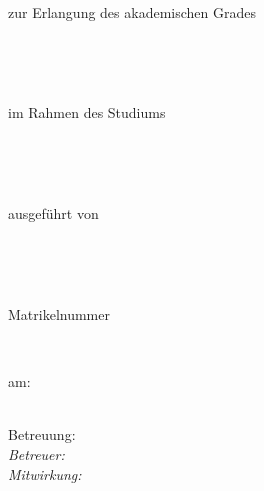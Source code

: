 \begin{titlepage}
\begin{center}
\begin{Large}\thesistype \end{Large} \bigskip \\
\begin{normalsize}zur Erlangung des akademischen Grades \end{normalsize} \bigskip \\
\begin{Large}\dmseries\zuerlangendertitel\end{Large} \bigskip \\
\begin{normalsize}im Rahmen des Studiums\end{normalsize} \bigskip \\
\begin{large}\dmseries\studium\end{large} \bigskip \\
\begin{normalsize}ausgef\"{u}hrt von \end{normalsize} \bigskip \\
\begin{large}\dmseries\thesisauthor\end{large} \\
\begin{normalsize}Matrikelnummer \matrikelnr\end{normalsize} \\
\end{center}

\begin{flushleft}
am: \\ \textit{\institut} \\
\end{flushleft}


\begin{flushleft}
\smallskip
Betreuung: \\
\textit{Betreuer: \betreuer} \\
\textit{Mitwirkung: \assistent}
\end{flushleft}

\date{\today}
\numdate

\footnotesize
\vspace{1.5cm}


\end{titlepage}
